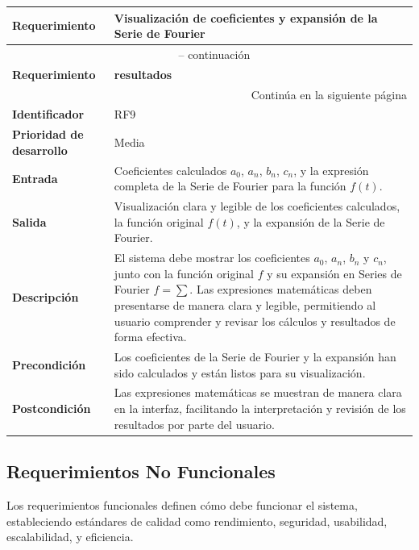 \begin{longtable}{|m{3.5cm}|m{9.5cm}|}
	\hline
	\rowcolor{black!75} \color{white}\textbf{Requerimiento} & \color{white}\textbf{Visualización de coeficientes y expansión de la Serie de Fourier} \\
	\hline
	\endfirsthead
	\multicolumn{2}{c}{{\tablename\ \thetable{} -- continuación}} \\
	\hline
	\rowcolor{black!75} \color{white}\textbf{Requerimiento} & \color{white}\textbf{resultados} \\
	\hline
	\endhead
	\hline \multicolumn{2}{r}{{Continúa en la siguiente página}} \\
	\endfoot
	\hline
	\endlastfoot
	
	\textbf{Identificador} & RF9 \\
	\hline
	\textbf{Prioridad de desarrollo} & Media \\
	\hline
	\textbf{Entrada} & Coeficientes calculados \( a_0 \), \( a_n \), \( b_n \), \( c_n \), y la expresión completa de la Serie de Fourier para la función \( f(t) \). \\
	\hline
	\textbf{Salida} & Visualización clara y legible de los coeficientes calculados, la función original \( f(t) \), y la expansión de la Serie de Fourier. \\
	\hline
	\textbf{Descripción} & El sistema debe mostrar los coeficientes \( a_0 \), \( a_n \), \( b_n \) y \( c_n \), junto con la función original \( f \) y su expansión en Series de Fourier $f = \sum$. Las expresiones matemáticas deben presentarse de manera clara y legible, permitiendo al usuario comprender y revisar los cálculos y resultados de forma efectiva. \\
	\hline
	\textbf{Precondición} & Los coeficientes de la Serie de Fourier y la expansión han sido calculados y están listos para su visualización. \\
	\hline
	\textbf{Postcondición} & Las expresiones matemáticas se muestran de manera clara en la interfaz, facilitando la interpretación y revisión de los resultados por parte del usuario. \\
	\hline
\end{longtable}
\caption{Requerimiento funcional No. 9} \label{tabla:RF9}
\vspace{0.5cm}



\subsection{Requerimientos No Funcionales}
Los requerimientos funcionales definen cómo debe funcionar el sistema, estableciendo estándares de calidad como rendimiento, seguridad, usabilidad, escalabilidad, y eficiencia.

